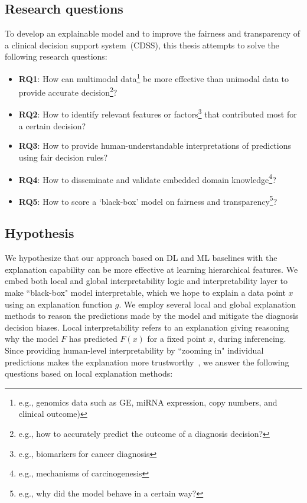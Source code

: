 \subsection{Research questions}
To develop an explainable model and to improve the fairness and transparency of a clinical decision support system~(CDSS), this thesis attempts to solve the following research questions: 

\vspace{-2mm}
\begin{itemize}[noitemsep]
    \item \textbf{RQ1}: How can multimodal data\footnote{e.g., genomics data such as GE, miRNA expression, copy numbers, and clinical outcome)} be more effective than unimodal data to provide accurate decision\footnote{e.g., how to accurately predict the outcome of a diagnosis decision?}? 
    \item \textbf{RQ2}: How to identify relevant features or factors\footnote{e.g., biomarkers for cancer diagnosis} that contributed most for a certain decision? 
    \item \textbf{RQ3}: How to provide human-understandable interpretations of predictions using fair decision rules? 
    \item \textbf{RQ4}: How to disseminate and validate embedded domain knowledge\footnote{e.g., mechanisms of carcinogenesis}?
    \item \textbf{RQ5}: How to score a `black-box' model on fairness and transparency\footnote{e.g., why did the model behave in a certain way?}? 
\end{itemize}
\vspace{-2mm}

\subsection{Hypothesis}
We hypothesize that our approach based on DL and ML baselines with the explanation capability can be more effective at learning hierarchical features. We embed both local and global interpretability logic and interpretability layer to make ``black-box" model interpretable, which we hope to explain a data point $x$ using an explanation function $g$. We employ several local and global explanation methods to reason the predictions made by the model and mitigate the diagnosis decision biases. Local interpretability refers to an explanation giving reasoning why the model $F$ has predicted $F(x)$ for a fixed point $x$, during inferencing. Since providing human-level interpretability by ``zooming in" individual predictions makes the explanation more trustworthy~\cite{ribeiro2018anchors}, we answer the following questions based on local explanation methods: 

